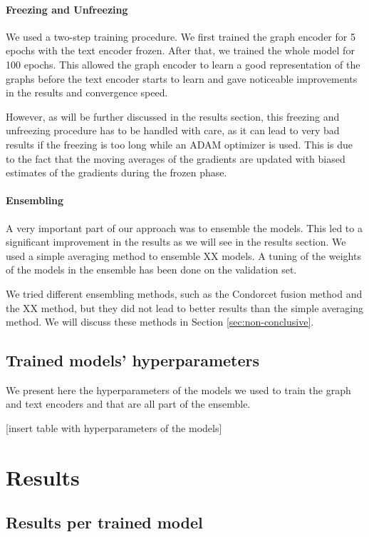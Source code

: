 \documentclass[switch, 12pt]{article}
\begin{document}
\begin{multicols}{2}
    \paragraph*{Freezing and Unfreezing}
    We used a two-step training procedure. We first trained the graph encoder for 5 epochs with the text encoder frozen. After that, we trained the whole model for 100 epochs. This allowed the graph encoder to learn a good representation of the graphs before the text encoder starts to learn and gave noticeable improvements in the results and convergence speed.

    However, as will be further discussed in the results section, this freezing and unfreezing procedure has to be handled with care, as it can lead to very bad results if the freezing is too long while an ADAM optimizer is used. This is due to the fact that the moving averages of the gradients are updated with biased estimates of the gradients during the frozen phase.

    \paragraph*{Ensembling}
    A very important part of our approach was to ensemble the models. This led to a significant improvement in the results as we will see in the results section. We used a simple averaging method to ensemble XX models. A tuning of the weights of the models in the ensemble has been done on the validation set.

    We tried different ensembling methods, such as the Condorcet fusion method and the XX method, but they did not lead to better results than the simple averaging method. We will discuss these methods in Section \ref{sec:non-conclusive}.

    \subsection{Trained models' hyperparameters}
    We present here the hyperparameters of the models we used to train the graph and text encoders and that are all part of the ensemble.

        [insert table with hyperparameters of the models]
    \section{Results}
    \subsection{Results per trained model}

\end{multicols}
\end{document}
